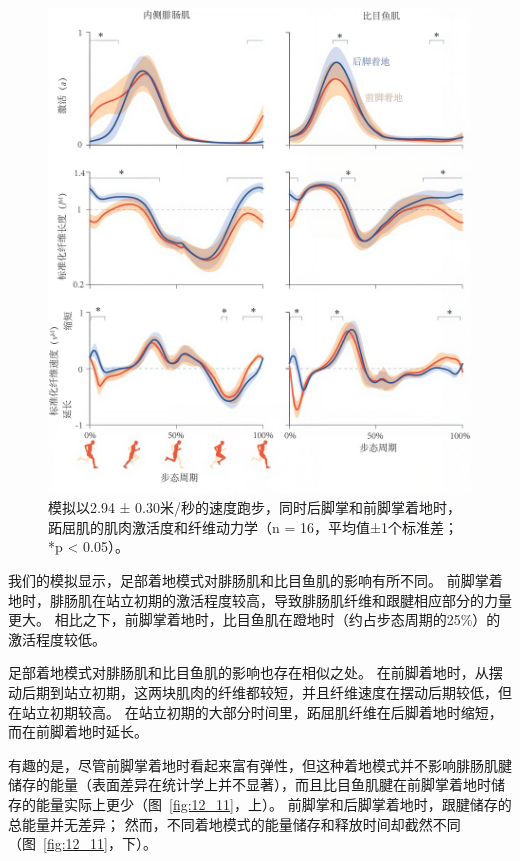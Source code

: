 \begin{figure}[!htb]
	\centering
	\includegraphics[width=1.0\linewidth]{chap12/12_10}
	\caption{模拟以2.94 ± 0.30米/秒的速度跑步，同时后脚掌和前脚掌着地时，跖屈肌的肌肉激活度和纤维动力学（n = 16，平均值±1个标准差；*p < 0.05）\cite{yong2020foot}。 \label{fig:12_10}}
\end{figure}


我们的模拟显示，足部着地模式对腓肠肌和比目鱼肌的影响有所不同。
前脚掌着地时，腓肠肌在站立初期的激活程度较高，导致腓肠肌纤维和跟腱相应部分的力量更大。
相比之下，前脚掌着地时，比目鱼肌在蹬地时（约占步态周期的25\%）的激活程度较低。


足部着地模式对腓肠肌和比目鱼肌的影响也存在相似之处。
在前脚着地时，从摆动后期到站立初期，这两块肌肉的纤维都较短，并且纤维速度在摆动后期较低，但在站立初期较高。
在站立初期的大部分时间里，跖屈肌纤维在后脚着地时缩短，而在前脚着地时延长。


有趣的是，尽管前脚掌着地时看起来富有弹性，但这种着地模式并不影响腓肠肌腱储存的能量（表面差异在统计学上并不显著），而且比目鱼肌腱在前脚掌着地时储存的能量实际上更少（图~\ref{fig:12_11}，上）。
前脚掌和后脚掌着地时，跟腱储存的总能量并无差异；
然而，不同着地模式的能量储存和释放时间却截然不同（图~\ref{fig:12_11}，下）。

